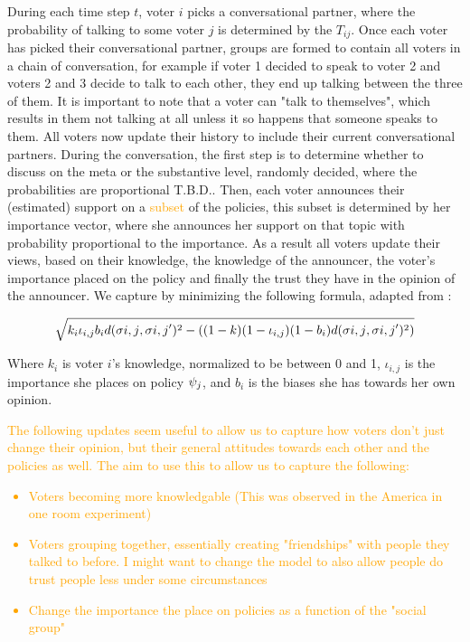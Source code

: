 During each time step $t$, voter $i$ picks a conversational partner, where the probability of talking to some voter $j$ is determined by the $T_{ij}$. Once each voter has picked their conversational partner, groups are formed to contain all voters in a chain of conversation, for example if voter 1 decided to speak to voter 2 and voters 2 and 3 decide to talk to each other, they end up talking between the three of them. It is important to note that a voter can "talk to themselves", which results in them not talking at all unless it so happens that someone speaks to them. All voters now update their history to include their current conversational partners. During the conversation, the first step is to determine whether to discuss on the meta or the substantive level, randomly decided, where the probabilities are proportional T.B.D..
Then, each voter announces their (estimated) support on a \textcolor{orange}{subset} of the policies, this subset is determined by her importance vector, where she announces her support on that topic with probability proportional to the importance. As a result all voters update their views, based on their knowledge, the knowledge of the announcer, the voter's importance placed on the policy and finally the trust they have in the opinion of the announcer. We capture by minimizing the following formula, adapted from \citet{radDeliberationSinglePeakednessCoherent2021}:

\begin{equation}
	\label{eq:abm_update_function}
	\sqrt{k_{i}\iota_{i,j} b_{i}d(\sigma{i,j}, \sigma{i,j}')^{2} - ((1-k)(1-\iota_{i,j})(1-b_{i})d(\sigma{i,j}, \sigma{i,j}')^{2})}
\end{equation}

Where $k_{i}$ is voter $i$'s knowledge, normalized to be between 0 and 1, $\iota_{i,j}$ is the importance she places on policy $\psi_{j}$, and $b_{i}$ is the biases she has towards her own opinion.

\textcolor{orange}{The following updates seem useful to allow us to capture how voters don't just change their opinion, but their general attitudes towards each other and the policies as well. The aim to use this to allow us to capture the following:}
\textcolor{orange}{
\begin{itemize}
	\item Voters becoming more knowledgable (This was observed in the America in one room experiment)
	\item Voters grouping together, essentially creating "friendships" with people they talked to before. I might want to change the model to also allow people do trust people less under some circumstances
	\item Change the importance the place on policies as a function of the "social group"
\end{itemize}}

